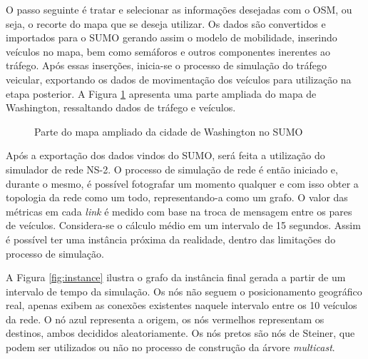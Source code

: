 O passo seguinte  é tratar e selecionar  as informações desejadas com  o OSM, ou
seja, o  recorte do  mapa que  se deseja  utilizar. Os  dados são  convertidos e
importados para o SUMO gerando assim  o modelo de mobilidade, inserindo veículos
no mapa,  bem como  semáforos e  outros componentes  inerentes ao  tráfego. Após
essas  inserções,  inicia-se  o  processo  de  simulação  do  tráfego  veicular,
exportando  os dados  de  movimentação  dos veículos  para  utilização na  etapa
posterior. A Figura  \ref{fig:map-sumo} apresenta uma parte ampliada  do mapa de
Washington, ressaltando dados de tráfego e veículos.

\begin{figure}[!ht]
    \centering
    \caption{Parte do mapa ampliado da cidade de Washington no SUMO}
    \label{fig:map-sumo}
\end{figure}

Após a exportação dos dados vindos do SUMO, será feita a utilização do simulador
de rede  NS-2. O processo  de simulação  de rede é  então iniciado e,  durante o
mesmo, é possível fotografar um momento qualquer e com isso obter a topologia da
rede como um todo,  representando-a como um grafo. O valor  das métricas em cada
\textit{link} é medido com base na troca de mensagem entre os pares de veículos.
Considera-se o  cálculo médio em um  intervalo de 15 segundos.  Assim é possível
ter uma  instância próxima da  realidade, dentro  das limitações do  processo de
simulação.

A Figura \ref{fig:instance}  ilustra o grafo da instância final  gerada a partir
de  um intervalo  de tempo  da  simulação. Os  nós não  seguem o  posicionamento
geográfico real, apenas exibem as conexões existentes naquele intervalo entre os
10 veículos da rede. O nó azul representa a origem, os nós vermelhos representam
os destinos, ambos  decididos aleatoriamente. Os nós pretos são  nós de Steiner,
que  podem  ser   utilizados  ou  não  no  processo  de   construção  da  árvore
\textit{multicast}.

